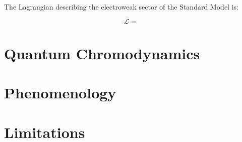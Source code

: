 The Lagrangian describing the electroweak sector of the Standard Model is:

\begin{equation}\label{eq:ew_lagrangian}
    \mathcal{L} =
\end{equation}

\section{Quantum Chromodynamics}\label{sec:sm_qcd}

\section{Phenomenology}\label{sec:sm_pheno}

\section{Limitations}\label{sec:sm_limits}
